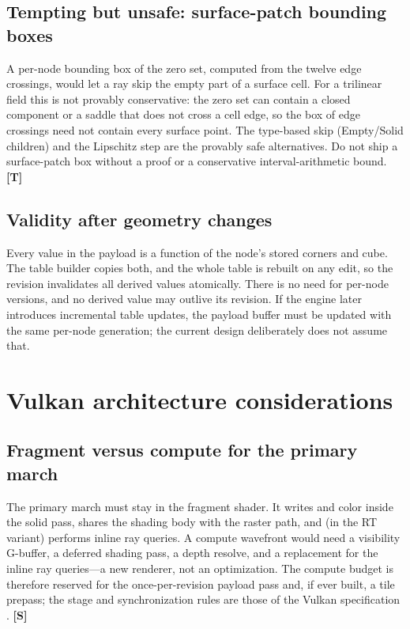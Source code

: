 \documentclass[11pt,a4paper]{article}
\newcommand{\evS}{\textsf{\textbf{\color{evS}[S]}}}
\newcommand{\evT}{\textsf{\textbf{\color{evT}[T]}}}
\newcommand{\code}[1]{\texttt{\detokenize{#1}}}
\theoremstyle{plain}
\theoremstyle{definition}
\theoremstyle{remark}
\begin{document}
\subsection{Tempting but unsafe: surface-patch bounding boxes}

A per-node bounding box of the zero set, computed from the twelve edge
crossings, would let a ray skip the empty part of a surface cell. For a
trilinear field this is not provably conservative: the zero set can contain a
closed component or a saddle that does not cross a cell edge, so the box of
edge crossings need not contain every surface point. The type-based skip
(Empty/Solid children) and the Lipschitz step are the provably safe
alternatives. Do not ship a surface-patch box without a proof or a conservative
interval-arithmetic bound. \evT

\subsection{Validity after geometry changes}

Every value in the payload is a function of the node's stored corners and cube.
The table builder copies both, and the whole table is rebuilt on any edit, so
the revision invalidates all derived values atomically. There is no need for
per-node versions, and no derived value may outlive its revision. If the
engine later introduces incremental table updates, the payload buffer must be
updated with the same per-node generation; the current design deliberately
does not assume that.

\section{Vulkan architecture considerations}
\label{sec:vulkan}

\subsection{Fragment versus compute for the primary march}

The primary march must stay in the fragment shader. It writes
\code{gl_FragDepth} and color inside the solid pass, shares the shading body
with the raster path, and (in the RT variant) performs inline ray queries. A
compute wavefront would need a visibility G-buffer, a deferred shading pass, a
depth resolve, and a replacement for the inline ray queries---a new renderer,
not an optimization. The compute budget is therefore reserved for the
once-per-revision payload pass and, if ever built, a tile prepass; the stage
and synchronization rules are those of the Vulkan specification \cite{vkspec}.
\evS
\end{document}
